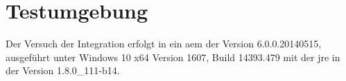 \section{Testumgebung}
Der Versuch der Integration erfolgt in ein \ac{aem} der Version 6.0.0.20140515, ausgeführt unter Windows 10 x64 Version 1607, Build 14393.479 mit der \ac{jre} in der Version 1.8.0\_111-b14.